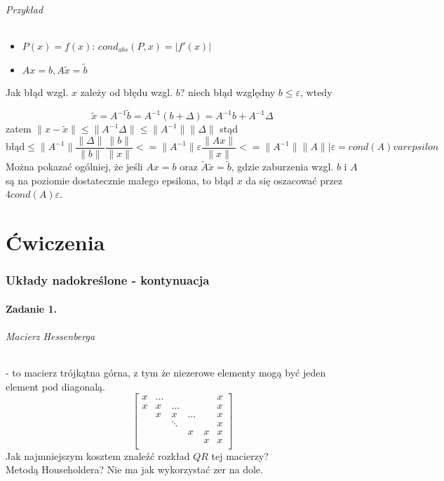 \documentclass{article}
\begin{document}
\paragraph{Przykład}
\begin{itemize}
\item $ P(x)= f(x) $:  $ cond_{abs}(P, x)=|f'(x)| $
\item $ Ax=b, A\tilde x=\tilde b$
\end{itemize}
Jak błąd wzgl. $x$ zależy od błędu wzgl. $b$?
niech błąd względny $b \le \varepsilon$, wtedy 

$$\tilde{x} = A^{-1}\tilde{b}=A^{-1}(b+\Delta)=A^{-1}b+A^{-1}\Delta$$
zatem $\|x-\tilde{x}\|\le\|A^{-1}\Delta\|\le\|A^{-1}\|\|\Delta\|$
stąd $$\text{błąd}  \le  \|A^{-1}\|\frac{\|\Delta\|}{\|b\|}\frac{\|b\|}{\|x\|}<=\|A^{-1}\| \varepsilon \frac{\|Ax\|}{\|x\|} <= \|A^{-1}\|\|A\||\varepsilon =cond(A)varepsilon$$
Można pokazać ogólniej, że jeśli $ Ax=b $ oraz $ \tilde{A}\tilde{x}=\tilde{b} $, gdzie zaburzenia wzgl. $ b $ i $ A $ są na poziomie dostatecznie małego epsilona, to błąd $ x $ da się oszacować przez $ 4cond(A)\varepsilon $.



\part{Ćwiczenia}
\section{Układy nadokreślone - kontynuacja}
\subsection{Zadanie 1.}
\paragraph{Macierz Hessenberga} - to macierz trójkątna górna, z tym że niezerowe elementy mogą być jeden element pod diagonalą.
$$\begin{bmatrix}
	x&\ldots&&&&x\\
	x&x&\ldots&&&x\\
	&x&x&\ldots&&x\\
	&&\ddots&&&x\\
	&&&x&x&x\\
	&&&&x&x\\
\end{bmatrix}$$
Jak najmniejszym kosztem znaleźć rozkład $ QR $ tej macierzy?\\
Metodą Householdera? Nie ma jak wykorzystać zer na dole.
\end{document}
